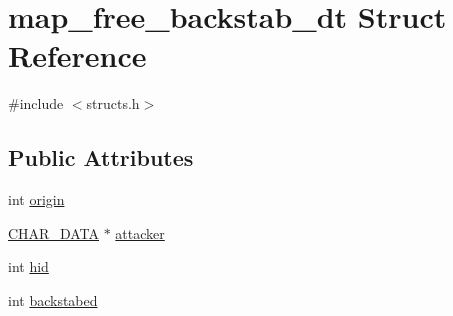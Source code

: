 \hypertarget{structmap__free__backstab__dt}{\section{map\-\_\-free\-\_\-backstab\-\_\-dt Struct Reference}
\label{structmap__free__backstab__dt}
}


{\ttfamily \#include $<$structs.\-h$>$}

\subsection*{Public Attributes}
\begin{DoxyCompactItemize}
\item 
int \hyperlink{structmap__free__backstab__dt_ab996734d78f3dd7b36dd46c6b7c12e62}{origin}
\item 
\hyperlink{structs_8h_af33ed1e66e8541a08bed257124f50f31}{C\-H\-A\-R\-\_\-\-D\-A\-T\-A} $\ast$ \hyperlink{structmap__free__backstab__dt_a6304d2a852315acac57974a49aace111}{attacker}
\item 
int \hyperlink{structmap__free__backstab__dt_a0338cf2d2c577bd0ab3c3722615da889}{hid}
\item 
int \hyperlink{structmap__free__backstab__dt_a8ba4127866102f63b8649c64582ad582}{backstabed}
\end{DoxyCompactItemize}


